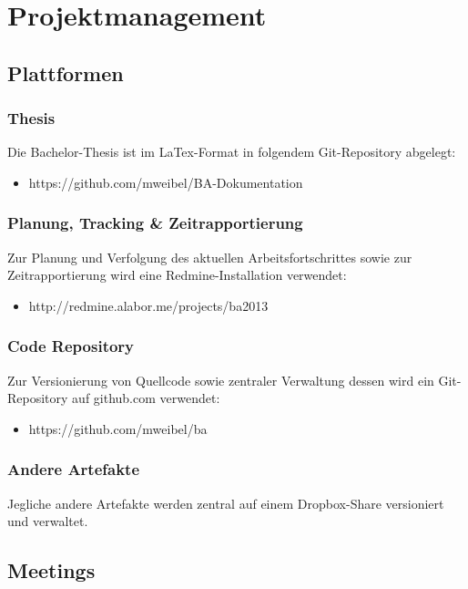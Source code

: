 \chapter{Projektmanagement}

\section{Plattformen}
\subsection{Thesis}
Die Bachelor-Thesis ist im LaTex-Format in folgendem Git-Repository abgelegt:

\begin{itemize}
	\item https://github.com/mweibel/BA-Dokumentation
\end{itemize}

\subsection{Planung, Tracking \& Zeitrapportierung}
Zur Planung und Verfolgung des aktuellen Arbeitsfortschrittes sowie zur Zeitrapportierung wird eine Redmine-Installation verwendet:

\begin{itemize}
	\item http://redmine.alabor.me/projects/ba2013
\end{itemize}

\subsection{Code Repository}
Zur Versionierung von Quellcode sowie zentraler Verwaltung dessen wird ein Git-Repository auf github.com verwendet:

\begin{itemize}
	\item https://github.com/mweibel/ba
\end{itemize}

\subsection{Andere Artefakte}
Jegliche andere Artefakte werden zentral auf einem Dropbox-Share versioniert und verwaltet.


\section{Meetings}
